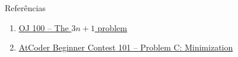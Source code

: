 \begin{frame}[fragile]{Referências}

    \begin{enumerate}
        \item \href{https://onlinejudge.org/index.php?option=com_onlinejudge&Itemid=8&page=show_problem&category=0&problem=36&mosmsg=Submission+received+with+ID+22978803}{OJ 100 -- The $3n + 1$ problem}

        \item \href{https://atcoder.jp/contests/abc101/tasks/arc099_a}{AtCoder Beginner Contest 101 -- Problem C: Minimization}
    \end{enumerate}

\end{frame}
